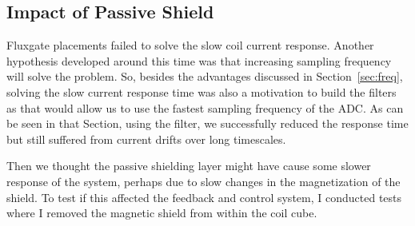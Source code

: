 



\subsection{Impact of Passive Shield}

Fluxgate placements failed to solve the slow coil current response.
Another hypothesis developed around this time was that increasing
sampling frequency will solve the problem.  So, besides the advantages
discussed in Section~\ref{sec:freq}, solving the slow current response
time was also a motivation to build the filters as that would allow us
to use the fastest sampling frequency of the ADC.  As can be seen in
that Section, using the filter, we successfully reduced the response
time but still suffered from current drifts over long timescales.

Then we thought the passive shielding layer might have cause some
slower response of the system, perhaps due to slow changes in the
magnetization of the shield. To test if this affected the feedback and
control system, I conducted tests where I removed the magnetic shield
from within the coil cube.


